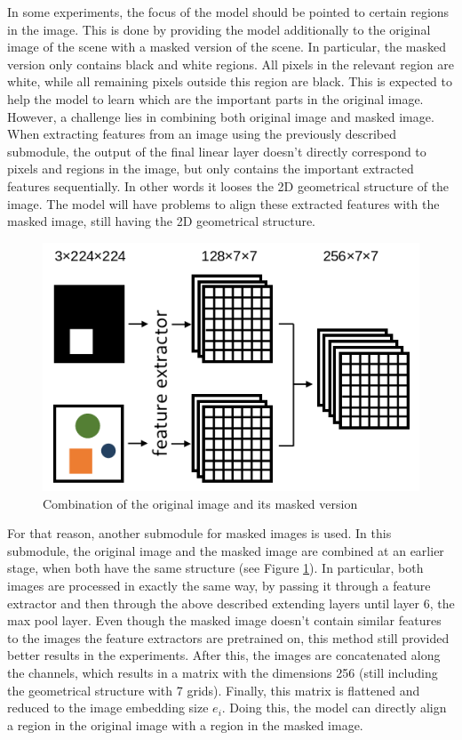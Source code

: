 In some experiments, the focus of the model should be pointed to certain regions in the image.
This is done by providing the model additionally to the original image of the scene with a masked version of the scene.
In particular, the masked version only contains black and white regions.
All pixels in the relevant region are white, while all remaining pixels outside this region are black.
This is expected to help the model to learn which are the important parts in the original image.
However, a challenge lies in combining both original image and masked image.
When extracting features from an image using the previously described submodule, the output of the final linear layer doesn't directly correspond to pixels and regions in the image, but only contains the important extracted features sequentially.
In other words it looses the 2D geometrical structure of the image.
The model will have problems to align these extracted features with the masked image, still having the 2D geometrical structure.

\begin{figure}[ht]
    \centering
    \includegraphics[width=.48\linewidth]{figures/masked_image_combination.png}
    \caption{Combination of the original image and its masked version}
    \label{fig:masked-combination}
\end{figure}

For that reason, another submodule for masked images is used.
In this submodule, the original image and the masked image are combined at an earlier stage, when both have the same structure (see Figure \ref{fig:masked-combination}).
In particular, both images are processed in exactly the same way, by passing it through a feature extractor and then through the above described extending layers until layer 6, the max pool layer.
Even though  the masked image doesn't contain similar features to the images the feature extractors are pretrained on, this method still provided better results in the experiments.
After this, the images are concatenated along the channels, which results in a matrix with the dimensions 256 (still including the geometrical structure with 7 grids).
Finally, this matrix is flattened and reduced to the image embedding size $e_i$.
Doing this, the model can directly align a region in the original image with a region in the masked image.

